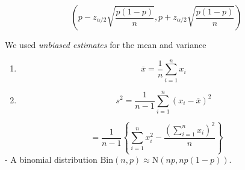 \documentclass[
]{book}
\theoremstyle{definition}
\theoremstyle{definition}
\theoremstyle{definition}
\theoremstyle{definition}
\theoremstyle{remark}
\begin{document}
\[\left(p - z_{\alpha/2}\sqrt{\frac{p(1-p)}{n}}, p + z_{\alpha/2}\sqrt{\frac{p(1-p)}{n}}\right)\]

We used \emph{unbiased estimates} for the mean and variance

\begin{enumerate}
\def\labelenumi{\arabic{enumi}.}
\item
  \[\bar{x} = \frac{1}{n}\sum_{i=1}^n x_i\]
\item
  \[s^2 = \frac{1}{n-1}\sum_{i=1}^n (x_i - \bar{x})^2 \]
\end{enumerate}

\[=\frac{1}{n-1}\left\{\sum_{i=1}^nx_i^2 - \frac{\left(\sum_{i=1}^n x_i\right)^2}{n} \right\} \]
- A binomial distribution \(\text{Bin}(n,p) \approx \text{N}(np, np(1-p))\).

  
\end{document}
